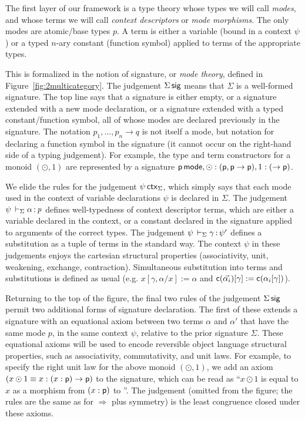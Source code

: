 \documentclass[a4paper,USenglish]{lipics-v2016}
\newcommand\deq{\ensuremath{\equiv}}
\newcommand\spr{\ensuremath{\Rightarrow}} %
\begin{document}
The first layer of our framework is a type theory whose types we will call
\emph{modes}, and whose terms we will call \emph{context descriptors} or
\emph{mode morphisms}.  The only modes are atomic/base types $p$.  A
term is either a variable (bound in a context $\psi$) or a typed $n$-ary
constant (function symbol)  applied to terms of the appropriate
types.

This is formalized in the notion of signature, or \emph{mode theory},
defined in Figure~\ref{fig:2multicategory}.  The judgement $\Sigma \, \mathsf{sig}$ means that $\Sigma$ is a well-formed signature.  The top line
says that a signature is either empty, or a signature extended with a
new mode declaration, or a signature extended with a typed
constant/function symbol, all of whose modes are declared previously in
the signature.  The notation $p_1,\ldots,p_n \to q$ is not itself a
mode, but notation for declaring a function symbol in the signature (it
cannot occur on the right-hand side of a typing judgement).  For
example, the type and term constructors for a monoid $(\odot,1)$ are
represented by a signature $\mathsf{p} \, \mathsf{mode}, \mathsf{\odot} :
(\mathsf{p},\mathsf{p} \to \mathsf{p}), 1 : (\to \mathsf{p})$.

We elide the rules for the judgement $\psi \, \mathsf{ctx}_\Sigma$, which
simply says that each mode used in the context of variable declarations
$\psi$ is declared in $\Sigma$.  The judgement
$\psi \,\vdash_{\Sigma} \mathit{\alpha} \, \mathit{:} \, \mathit{p}$ defines well-typedness of context
descriptor terms, which are either a variable declared in the context,
or a constant declared in the signature applied to arguments of the
correct types.  The judgement $\psi \,\vdash_{\Sigma} \mathit{\gamma} \, \mathit{:} \, \mathit{\psi'}$
defines a substitution as a tuple of terms in the standard way.  The
context $\psi$ in these judgements enjoys the cartesian structural
properties (associativity, unit, weakening, exchange, contraction).
Simultaneous substitution into terms and substitutions is defined as
usual (e.g.  $x[\gamma,\alpha/x] := \alpha$ and
$\mathsf{c}(\vec{\alpha_i})[\gamma] := \mathsf{c}(\alpha_i[\gamma])$).

Returning to the top of the figure, the final two rules of the judgement
$\Sigma \, \mathsf{sig}$ permit two additional forms of signature declaration.
The first of these extends a signature with an equational axiom between
two terms $\alpha$ and $\alpha'$ that have the same mode $p$, in the
same context $\psi$, relative to the prior signature $\Sigma$.  These
equational axioms will be used to encode reversible object language
structural properties, such as associativity, commutativity, and unit
laws.  For example, to specify the right unit law for the above monoid
$(\odot,1)$, we add an axiom $(x \odot 1 \deq x : (x : \dsd{p}) \to
\dsd{p})$ to the signature, which can be read as ``$x \odot 1$ is equal
to $x$ as a morphism from $(x : \mathsf{p})$ to ''.  The judgement
 (omitted from the figure; the
rules are the same as for $\spr$ plus symmetry) is the least congruence
closed under these axioms.
\end{document}
